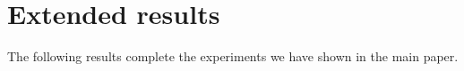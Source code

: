 \documentclass[10pt,a4paper]{article}
\begin{document}

\section{Extended results}

\noindent The following results complete the experiments we have shown
in the main paper.






\end{document}
